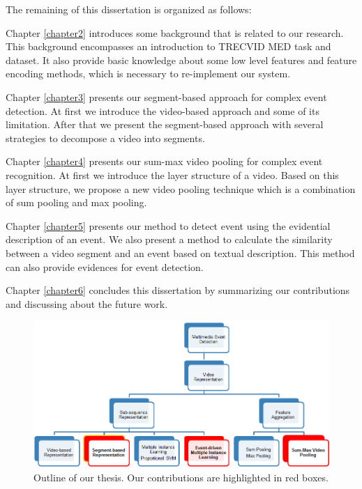 The remaining of this dissertation is organized as follows:

Chapter \ref{chapter2} introduces some background that is related to our research. This background encompasses an introduction to TRECVID MED task and dataset. It also provide basic knowledge about some low level features and feature encoding methods, which is necessary to re-implement our system. 

Chapter \ref{chapter3} presents our segment-based approach for complex event detection. At first we introduce the video-based approach and some of its limitation. After that we present the segment-based approach with several strategies to decompose a video into segments.

Chapter \ref{chapter4} presents our sum-max video pooling for complex event recognition. At first we introduce the layer structure of a video. Based on this layer structure, we propose a new video pooling technique which is a combination of sum pooling and max pooling.

Chapter \ref{chapter5} presents our method to detect event using the evidential description of an event. We also present a method to calculate the similarity between a video segment and an event based on textual description. This method can also provide evidences for event detection.

Chapter \ref{chapter6} concludes this dissertation by summarizing our contributions and discussing about the future work.

	\begin{figure}
		\centering
		\includegraphics[width=1\textwidth]{outline.png}
		\caption{Outline of our thesis. Our contributions are highlighted in red boxes.}
		\label{c1_outline}
	\end{figure}
	

